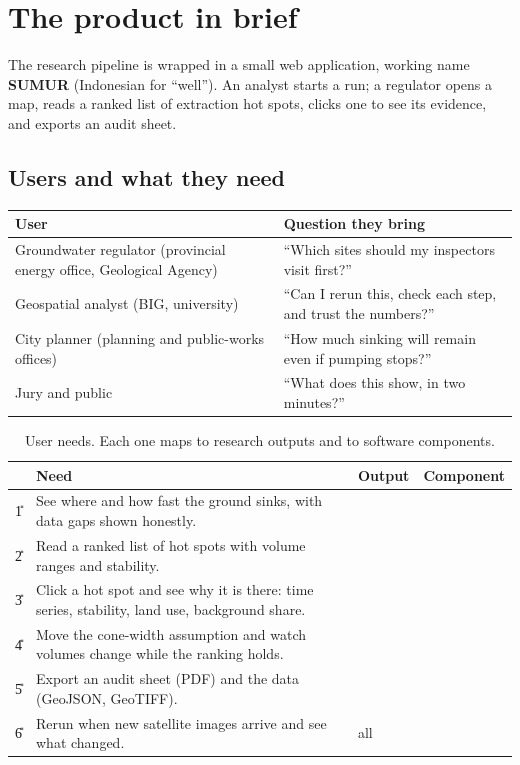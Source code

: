 \section{The product in brief}\label{sec:product}

\begin{inshort}
The research pipeline is wrapped in a small web application, working name \textbf{SUMUR} (Indonesian
for ``well''). An analyst starts a run; a regulator opens a map, reads a ranked list of extraction
hot spots, clicks one to see its evidence, and exports an audit sheet.
\end{inshort}

\subsection{Users and what they need}

{\small
\begin{xltabular}{\linewidth}{@{}L{38mm}Y@{}}
\toprule
\textbf{User} & \textbf{Question they bring}\\*
\midrule
Groundwater regulator (provincial energy office, Geological Agency) & ``Which sites should my inspectors
  visit first?''\\
Geospatial analyst (BIG, university) & ``Can I rerun this, check each step, and trust the numbers?''\\
City planner (planning and public-works offices) & ``How much sinking will remain even if pumping stops?''\\
Jury and public & ``What does this show, in two minutes?''\\
\bottomrule
\end{xltabular}}

{\small
\begin{xltabular}{\linewidth}{@{}L{8mm}Y L{22mm}L{24mm}@{}}
\caption{User needs. Each one maps to research outputs and to software components.}\label{tab:needs}\\*
\toprule
 & \textbf{Need} & \textbf{Output} & \textbf{Component}\\*
\midrule
\U{1} & See where and how fast the ground sinks, with data gaps shown honestly. &   &  \\
\U{2} & Read a ranked list of hot spots with volume ranges and stability. &  &  \\
\U{3} & Click a hot spot and see why it is there: time series, stability, land use, background share. &   & \\
\U{4} & Move the cone-width assumption and watch volumes change while the ranking holds. &  &  \\
\U{5} & Export an audit sheet (PDF) and the data (GeoJSON, GeoTIFF). &  & \\
\U{6} & Rerun when new satellite images arrive and see what changed. & all &  \\
\bottomrule
\end{xltabular}}

